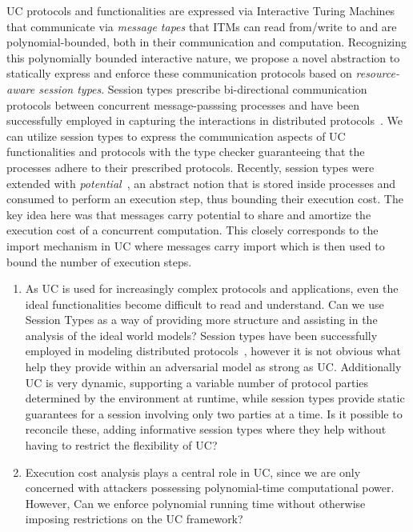 UC protocols and functionalities are expressed via Interactive Turing Machines that communicate via \emph{message tapes} that ITMs can read from/write to
and are polynomial-bounded, both in their communication and computation.
Recognizing this polynomially bounded interactive nature, we propose a novel abstraction to statically express and enforce these
communication protocols based on \emph{resource-aware session types}.
Session types prescribe bi-directional communication protocols between concurrent message-passsing processes and have been successfully employed
in capturing the interactions in distributed protocols~\cite{dasnomos,Das20FSCD,Das22LMCS,Das20arxiv}.
We can utilize session types to express the communication aspects of UC functionalities and protocols with the type checker
guaranteeing that the processes adhere to their prescribed protocols.
Recently, session types were extended with \emph{potential}~\cite{das2018work}, an abstract notion that is stored inside processes and
consumed to perform an execution step, thus bounding their execution cost.
The key idea here was that messages carry potential to share and amortize the execution cost of a concurrent computation.
This closely corresponds to the import mechanism in UC where messages carry import which is then used to bound the number of execution steps.

\begin{enumerate}
\item 
As UC is used for increasingly complex protocols and applications, even the ideal functionalities become difficult to read and understand.
Can we use Session Types as a way of providing more structure and assisting in the analysis of the ideal world models?
Session types have been successfully employed in modeling distributed protocols~\cite{das2018work,dasnomos}, however it is not obvious what help they provide within an adversarial model as strong as UC.
Additionally UC is very dynamic, supporting a variable number of protocol parties determined by the environment at runtime, while session types provide static guarantees for a session involving only two parties at a time.
Is it possible to reconcile these, adding informative session types where they help without having to restrict the flexibility of UC?

\item Execution cost analysis plays a central role in UC, since we are only concerned with
attackers possessing polynomial-time computational power.
However, 
Can we enforce polynomial running time without otherwise imposing restrictions on the UC framework?

\end{enumerate}

